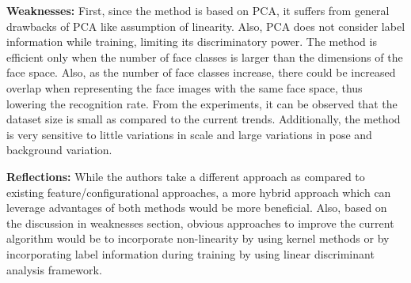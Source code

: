 \documentclass[10pt,twocolumn,letterpaper]{article}
\begin{document}
\noindent\textbf{Weaknesses:} First, since the method is based on PCA, it suffers from general drawbacks of PCA like  assumption of linearity. Also, PCA does not consider label information while training, limiting its discriminatory power. The method is efficient only when the number of face classes is larger than the dimensions of the face space. Also,   as the number of face classes increase, there could be increased overlap when representing the face images with the same face space, thus lowering the recognition rate. From the experiments, it can be observed that the dataset size is small as compared to the current trends. Additionally, the  method is very sensitive to little variations in scale and large variations in pose and background variation. 

\noindent\textbf{Reflections:} While the authors take a different approach as compared to existing feature/configurational approaches, a more hybrid approach which can leverage advantages of both methods would be more beneficial. Also, based on the discussion in weaknesses section,  obvious approaches to improve the current algorithm would be to incorporate non-linearity by using kernel methods or by incorporating label information during training by using linear discriminant analysis framework. 


{\small


}
\end{document}
